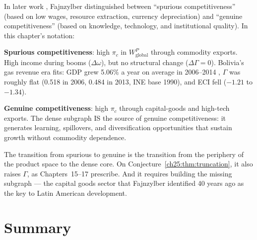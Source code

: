 \documentclass[../structural_economics_book.tex]{subfiles}
\begin{document}
\begin{prebisch}
In later work \citep{fajnzylber1988competitividad}, Fajnzylber distinguished between ``spurious competitiveness'' (based on low wages, resource extraction, currency depreciation) and ``genuine competitiveness'' (based on knowledge, technology, and institutional quality). In this chapter's notation:

\textbf{Spurious competitiveness}: high $\pi_c$ in $W^P_{\text{global}}$ through commodity exports. High income during booms ($\Delta\omega$), but no structural change ($\Delta\Gamma = 0$). Bolivia's gas revenue era fits: GDP grew 5.06\% a year on average in 2006--2014 \citep{worldbank2026wdi}, $\Gamma$ was roughly flat (0.518 in 2006, 0.484 in 2013, INE base 1990), and ECI fell ($-1.21$ to $-1.34$).

\textbf{Genuine competitiveness}: high $\pi_c$ through capital-goods and high-tech exports. The dense subgraph IS the source of genuine competitiveness: it generates learning, spillovers, and diversification opportunities that sustain growth without commodity dependence.

The transition from spurious to genuine is the transition from the periphery of the product space to the dense core. On Conjecture~\ref{ch25:thm:truncation}, it also raises $\Gamma$, as Chapters~15--17 prescribe. And it requires building the missing subgraph --- the capital goods sector that Fajnzylber identified 40 years ago as the key to Latin American development.
\end{prebisch}


\section{Summary}
\label{ch25:sec:summary}
\end{document}
